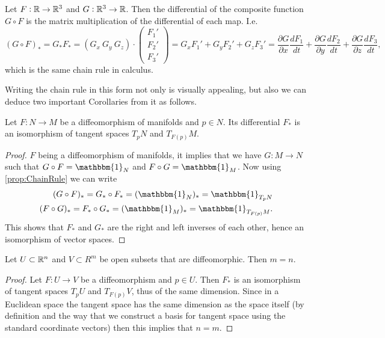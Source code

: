 \begin{example}
	Let $ F:\mathbb{R} \to \mathbb{R}^3 $ and $ G:\mathbb{R}^3 \to \mathbb{R} $. Then the differential of the composite function $ G\circ F $ is the matrix multiplication of the differential of each map. I.e.
	\[ (G \circ F)_* = G_* F_* = (G_x\ G_y\ G_z)\cdot 
	\begin{pmatrix}
		F_1' \\
		F_2' \\
		F_3'
	\end{pmatrix}
	= G_x F_1' + G_y F_2' + G_z F_3' 
	= \frac{\partial G}{\partial x} \frac{d F_1}{dt} 
	+\frac{\partial G}{\partial y} \frac{d F_2}{dt} 
	+\frac{\partial G}{\partial z} \frac{d F_3}{dt},
	 \]
	 which is the same chain rule in calculus.
\end{example}
Writing the chain rule in this form not only is visually appealing, but also we can deduce two important Corollaries from it as follows.

\begin{corollary}
	Let $ F:N\to M $ be a diffeomorphism of manifolds and $ p \in N $. Its differential $ F_* $ is an isomorphism of tangent spaces $ T_pN $ and $ T_{F(p)}M $.
\end{corollary}
\begin{proof}
	$ F $ being a diffeomorphism of manifolds, it implies that we have $ G: M \to N $ such that $ G\circ F = \mathbbm{1}_N $ and $ F\circ G = \mathbbm{1}_M $. Now using \autoref{prop:ChainRule} we can write
	\begin{align*}
		(G\circ F)_* = G_* \circ F_* = (\mathbbm{1}_N)_* = \mathbbm{1}_{T_pN}\\
		(F\circ G)_* = F_* \circ G_* = (\mathbbm{1}_M)_* = \mathbbm{1}_{T_{F(p)}M}.
	\end{align*}
	This shows that $ F_* $ and $ G_* $ are the right and left inverses of each other, hence an isomorphism of vector spaces.
\end{proof}
\begin{corollary}
	Let $ U \subset \mathbb{R}^n $ and $ V \subset R^m $ be open subsets that are diffeomorphic. Then $ m = n $.
\end{corollary}
\begin{proof}
	Let $ F: U \to V $ be a diffeomorphism and $ p \in U $. Then $ F_* $ is an isomorphism of tangent spaces $ T_pU $ and $ T_{F(p)}V $, thus of the same dimension. Since in a Euclidean space the tangent space has the same dimension as the space itself (by definition and the way that we construct a basis for tangent space using the standard coordinate vectors) then this implies that $ n = m $.
\end{proof}


